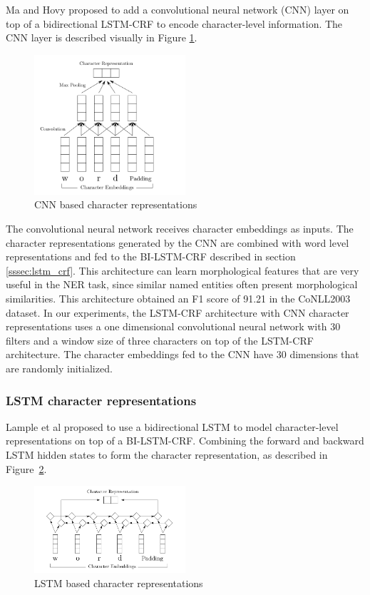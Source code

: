 \documentclass{nle}
\begin{document}
Ma and Hovy  proposed to add a convolutional neural network (CNN) layer 
on top of a bidirectional LSTM-CRF to encode character-level information. The CNN
layer is described visually in Figure \ref{fig:cnn}.

\begin{figure}[h]
  \centering
  \includegraphics[width=0.5\textwidth]{pics/cnn}
  \caption{CNN based character representations}
  \label{fig:cnn}
\end{figure}

The convolutional neural network receives character embeddings as inputs. The character 
representations generated by the CNN are combined with word level representations 
and fed to the BI-LSTM-CRF described in section \ref{sssec:lstm_crf}.
This architecture can learn morphological features that are very
useful in the NER task, since similar named entities often present morphological similarities. 
This architecture obtained an F1 score of 91.21 in the CoNLL2003 dataset. In our experiments, 
the LSTM-CRF architecture with CNN character representations uses a one dimensional convolutional 
neural network with 30 filters and a window size of three characters on top of the LSTM-CRF 
architecture. The character embeddings fed to the CNN have 30 dimensions that are randomly 
initialized.

\subsubsection{LSTM character representations}

Lample et al  proposed to use a bidirectional LSTM to model character-level 
representations on top of a BI-LSTM-CRF. Combining the forward and backward LSTM hidden states 
to form the character representation, as described in Figure~\ref{fig:lstm_char}. 

\begin{figure}[h]
  \centering
  \includegraphics[width=0.5\textwidth]{pics/lstm_char_representations}
  \caption{LSTM based character representations}
  \label{fig:lstm_char}
\end{figure}
\end{document}
